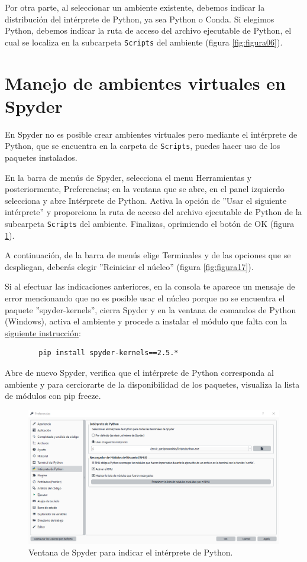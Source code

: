 \documentclass{article}
\begin{document}
	Por otra parte, al seleccionar un ambiente existente, debemos indicar la distribución del intérprete de Python, ya sea Python o Conda. Si elegimos Python, debemos indicar la ruta de acceso del archivo ejecutable de Python, el cual se localiza en la subcarpeta \texttt{Scripts} del ambiente (figura \ref{fig:figura06}).
	
	\section{Manejo de ambientes virtuales en Spyder}
	En Spyder no es posible crear ambientes virtuales pero mediante el intérprete de Python, que se encuentra en la carpeta de \texttt{Scripts}, puedes hacer uso de los paquetes instalados. \bigskip
	
	En la barra de menús de Spyder, selecciona el menu Herramientas y posteriormente, Preferencias; en la ventana que se abre, en el panel izquierdo selecciona y abre Intérprete de Python. Activa la opción de ''Usar el siguiente intérprete'' y proporciona la ruta de acceso del archivo ejecutable de Python de la subcarpeta \texttt{Scripts} del ambiente. Finalizas, oprimiendo el botón de OK (figura \ref{fig:figura16}).\bigskip
	
	A continuación, de la barra de menús elige Terminales y de las opciones que se despliegan, deberás elegir ''Reiniciar el núcleo'' (figura \ref{fig:figura17}). \bigskip 
	
	Si al efectuar las indicaciones anteriores, en la consola te aparece un mensaje de error mencionando que no es posible usar el núcleo porque no se encuentra el paquete ''spyder-kernels'', cierra Spyder y en la ventana de comandos de Python (Windows), activa el ambiente y procede a instalar el módulo que falta con la  \href{https://pypi.org/project/spyder-kernels/}{siguiente instrucción}:
	\begin{verbatim}
		pip install spyder-kernels==2.5.*
	\end{verbatim}
	
	Abre de nuevo Spyder, verifica que el intérprete de Python corresponda al ambiente y para cerciorarte de la disponibilidad de los paquetes, visualiza la lista de módulos con pip freeze.
	
	\begin{figure}[H]
		\centering
		\includegraphics[width=0.8\linewidth]{Figura16}
		\caption{Ventana de Spyder para indicar el intérprete de Python.}
		\label{fig:figura16}
	\end{figure}
	
\end{document}
